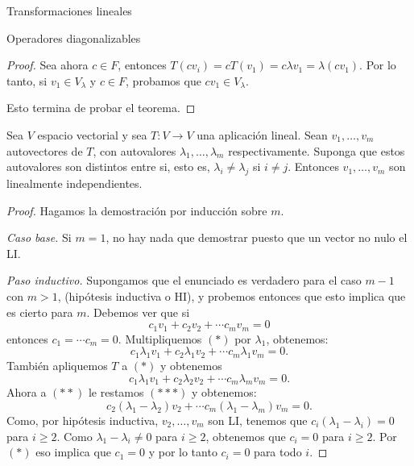 \begin{chapter}{Transformaciones lineales}
\begin{section}{Operadores diagonalizables}
\begin{proof}
            Sea ahora $c \in F$, entonces $T(cv_i) = cT(v_1) = c\lambda v_1 = \lambda (cv_1)$. Por lo tanto, si  $v_1\in V_\lambda$ y $c \in F$, probamos que $cv_1 \in V_\lambda$.
            
            Esto termina de probar el teorema.
        \end{proof}

        
        
        \begin{teorema}
            Sea $V$ espacio vectorial y sea $T: V \to V$ una aplicación lineal.  Sean $v_1,\ldots,v_m$ autovectores de $T$, con autovalores $\lambda_1,\ldots,\lambda_m$ respectivamente. Suponga que estos  autovalores son distintos entre si, esto es, $\lambda_i \ne \lambda_j$ si $i \ne j$. Entonces $v_1,\ldots,v_m$ son linealmente independientes.
        \end{teorema}
        \begin{proof}
            Hagamos la demostración por inducción sobre $m$.
            
            \textit{Caso base.} Si $m=1$, no hay nada que demostrar puesto que un vector no nulo el LI.
            
        
            
            \textit{Paso inductivo.} Supongamos que el enunciado es verdadero para el caso $m-1$ con $m>1$, (hipótesis inductiva o HI), y probemos entonces que esto implica que es cierto para $m$. Debemos ver  que si 
            \begin{equation}
            c_1v_1+	c_2v_2+ \cdots c_mv_m = 0 \tag{$*$}
            \end{equation}
            entonces $c_1 = \cdots c_m = 0$.
            Multipliquemos $(*)$ por $\lambda_1$, obtenemos:
            \begin{equation}
            c_1\lambda_1v_1+ c_2\lambda_1v_2+\cdots c_m\lambda_1v_m = 0. \tag{$**$}
            \end{equation}
            También apliquemos $T$ a $(*)$ y obtenemos
            \begin{equation}
            c_1\lambda_1v_1+ c_2\lambda_2v_2+\cdots c_m\lambda_mv_m = 0. \tag{$***$}
            \end{equation}
            Ahora a $(**)$ le restamos $(***)$ y obtenemos:
            \begin{equation}
            c_2(\lambda_1 -\lambda_2)v_2+\cdots c_m(\lambda_1 -\lambda_m)v_m = 0. 	 
            \end{equation}
            Como, por hipótesis inductiva, $v_2,\ldots,v_m$ son LI, tenemos que $c_i(\lambda_1 -\lambda_i)=0$ para $i\ge 2$. Como $\lambda_1 -\lambda_i \ne 0$ para $i\ge 2$, obtenemos que $c_i = 0$ para $i\ge 2$. Por $(*)$ eso implica que $c_1=0$ y por lo tanto $c_i=0$ para todo $i$.
        \end{proof}
        

\end{section}
\end{chapter}
